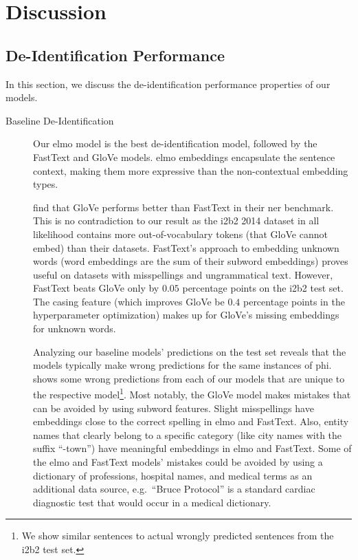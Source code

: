 
\section{Discussion}\label{sec:discussion}

\subsection{De-Identification Performance}
%
In this section, we discuss the de-identification performance properties of our models.

\begin{description}
    \item[Baseline De-Identification]
    Our \ac{elmo} model is the best de-identification model, followed by the FastText and GloVe models.
    \Ac{elmo} embeddings encapsulate the sentence context, making them more expressive than the non-contextual embedding types.
    
    \citet{reimers2017optimal} find that GloVe performs better than FastText in their \ac{ner} benchmark.
    This is no contradiction to our result as the i2b2 2014 dataset in all likelihood contains more out-of-vocabulary tokens (that GloVe cannot embed) than their datasets.
    FastText's approach to embedding unknown words (word embeddings are the sum of their subword embeddings) proves useful on datasets with misspellings and ungrammatical text.
    However, FastText beats GloVe only by $0.05$ percentage points on the i2b2 test set.
    The casing feature (which improves GloVe be $0.4$ percentage points in the hyperparameter optimization) makes up for GloVe's missing embeddings for unknown words.
    
    Analyzing our baseline models' predictions on the test set reveals that the models typically make wrong predictions for the same instances of \ac{phi}.
     shows some wrong predictions from each of our models that are unique to the respective model\footnote{We show similar sentences to actual wrongly predicted sentences from the i2b2 test set.}.
    Most notably, the GloVe model makes mistakes that can be avoided by using subword features. 
    Slight misspellings have embeddings close to the correct spelling in \ac{elmo} and FastText.
    Also, entity names that clearly belong to a specific category (like city names with the suffix ``-town'') have meaningful embeddings in \ac{elmo} and FastText.
    Some of the \ac{elmo} and FastText models' mistakes could be avoided by using a dictionary of professions, hospital names, and medical terms as an additional data source, e.g.\ ``Bruce Protocol'' is a standard cardiac diagnostic test that would occur in a medical dictionary.
\end{description}

